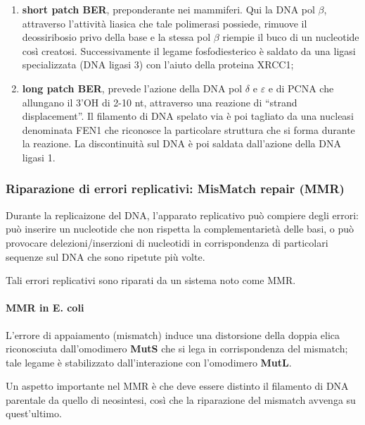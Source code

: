 \documentclass[]{article}
\begin{document}
\begin{enumerate}
\def\labelenumi{\arabic{enumi}.}
\itemsep1pt\parskip0pt
\item
  \textbf{short patch BER}, preponderante nei mammiferi. Qui la DNA pol
  $\beta$, attraverso l'attività liasica che tale polimerasi possiede,
  rimuove il deossiribosio privo della base e la stessa pol $\beta$
  riempie il buco di un nucleotide così creatosi. Successivamente il
  legame fosfodiesterico è saldato da una ligasi specializzata (DNA
  ligasi 3) con l'aiuto della proteina XRCC1;
\item
  \textbf{long patch BER}, prevede l'azione della DNA pol $\delta$ e
  $\varepsilon$ e di PCNA che allungano il 3'OH di 2-10 nt, attraverso
  una reazione di ``strand displacement''. Il filamento di DNA spelato
  via è poi tagliato da una nucleasi denominata FEN1 che riconosce la
  particolare struttura che si forma durante la reazione. La
  discontinuità sul DNA è poi saldata dall'azione della DNA ligasi 1.
\end{enumerate}

\subsubsection{Riparazione di errori replicativi: MisMatch repair
(MMR)}\label{riparazione-di-errori-replicativi-mismatch-repair-mmr}

Durante la replicaizone del DNA, l'apparato replicativo può compiere
degli errori: può inserire un nucleotide che non rispetta la
complementarietà delle basi, o può provocare delezioni/inserzioni di
nucleotidi in corrispondenza di particolari sequenze sul DNA che sono
ripetute più volte.

Tali errori replicativi sono riparati da un sistema noto come MMR.

\paragraph{MMR in E. coli}\label{mmr-in-e.-coli}

L'errore di appaiamento (mismatch) induce una distorsione della doppia
elica riconosciuta dall'omodimero \textbf{MutS} che si lega in
corrispondenza del mismatch; tale legame è stabilizzato dall'interazione
con l'omodimero \textbf{MutL}.

Un aspetto importante nel MMR è che deve essere distinto il filamento di
DNA parentale da quello di neosintesi, così che la riparazione del
mismatch avvenga su quest'ultimo.
\end{document}
